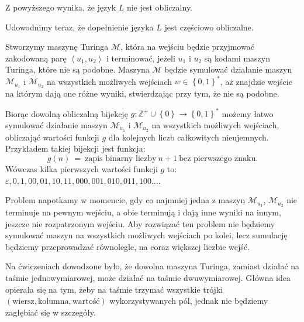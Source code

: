 \documentclass[12pt]{article}
\begin{document}
	\medskip
	
	Z powyższego wynika, że język \(L\) nie jest obliczalny.
	
	\bigskip
	
	Udowodnimy teraz, że dopełnienie języka \(L\) jest częściowo obliczalne.
	
	\medskip
	
	Stworzymy maszynę Turinga \(\mathcal{M}\), która na wejściu będzie
	przyjmować zakodowaną parę \(\left\langle u_{1}, u_{2} \right\rangle\) i
	terminować, jeżeli \(u_{1}\) i \(u_{2}\) są kodami maszyn Turinga, które nie
	są podobne. Maszyna \(\mathcal{M}\) będzie symulować działanie maszyn
	\(\mathcal{M}_{u_{1}}\) i \(\mathcal{M}_{u_{2}}\) na wszystkich możliwych
	wejściach \(w \in \left\{ 0, 1 \right\} ^ {\ast}\), aż znajdzie wejście na
	którym dają one różne wyniki, stwierdzając przy tym, że nie są podobne.
	
	\medskip
	
	Biorąc dowolną obliczalną bijekcję \(g : \mathbb{Z}^{+} \cup \left\{ 0
	\right\} \rightarrow \left\{ 0, 1 \right\} ^ {\ast}\) możemy łatwo symulować
	działanie maszyn \(\mathcal{M}_{u_{1}}\) i \(\mathcal{M}_{u_{2}}\) na
	wszystkich możliwych wejściach, obliczająć wartości funkcji \(g\) dla
	kolejnych liczb całkowitych nieujemnych. Przykładem takiej bijekcji jest
	funkcja:
	\[ g \left( n \right) \ = \ \text{zapis binarny liczby} \ n + 1 \ \text{bez
	pierwszego znaku.} \]
	Wówczas kilka pierwszych wartości funkcji \(g\) to: \(\varepsilon, 0, 1, 00,
	01, 10, 11, 000, 001, 010, 011, 100 \ldots\).
	
	\medskip
	
	Problem napotkamy w momencie, gdy co najmniej jedna z maszyn
	\(\mathcal{M}_{u_{1}}\), \(\mathcal{M}_{u_{2}}\) nie terminuje na pewnym
	wejściu, a obie terminują i dają inne wyniki na innym, jeszcze nie
	rozpatrzonym wejściu. Aby rozwiązać ten problem nie będziemy symulować
	maszyn na wszystkich możliwych wejściach po kolei, lecz sumulację będziemy
	przeprowadzać równolegle, na coraz większej liczbie wejść.
	
	\medskip
	
	Na ćwiczeniach dowodzone było, że dowolna maszyna Turinga, zamiast działać
	na taśmie jednowymiarowej, może działać na taśmie dwuwymiarowej. Główna idea
	opierała się na tym, żeby na taśmie trzymać wszystkie trójki \(\left(
	\text{wiersz}, \text{kolumna}, \text{wartość} \right)\) wykorzystywanych
	pól, jednak nie będziemy zagłębiać się w szczegóły.
	
	\medskip
	
\end{document}
